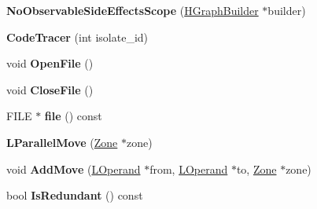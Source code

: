 \begin{DoxyCompactItemize}
\item 
\hypertarget{classv8_1_1internal_1_1_v8___f_i_n_a_l_a26fd2ae18963cc787e757897d83017cd}{}{\bfseries No\+Observable\+Side\+Effects\+Scope} (\hyperlink{classv8_1_1internal_1_1_h_graph_builder}{H\+Graph\+Builder} $\ast$builder)\label{classv8_1_1internal_1_1_v8___f_i_n_a_l_a26fd2ae18963cc787e757897d83017cd}

\item 
\hypertarget{classv8_1_1internal_1_1_v8___f_i_n_a_l_af9c1d9a94226317ecd0616056737d194}{}{\bfseries Code\+Tracer} (int isolate\+\_\+id)\label{classv8_1_1internal_1_1_v8___f_i_n_a_l_af9c1d9a94226317ecd0616056737d194}

\item 
\hypertarget{classv8_1_1internal_1_1_v8___f_i_n_a_l_aa5997ee7bfec3b18ab6f8c9a5dafd256}{}void {\bfseries Open\+File} ()\label{classv8_1_1internal_1_1_v8___f_i_n_a_l_aa5997ee7bfec3b18ab6f8c9a5dafd256}

\item 
\hypertarget{classv8_1_1internal_1_1_v8___f_i_n_a_l_a74d8c9b124c1b5a9e1134b5cfc484f50}{}void {\bfseries Close\+File} ()\label{classv8_1_1internal_1_1_v8___f_i_n_a_l_a74d8c9b124c1b5a9e1134b5cfc484f50}

\item 
\hypertarget{classv8_1_1internal_1_1_v8___f_i_n_a_l_af6e50f7ae2b70fe1111238bd7e3cf4ab}{}F\+I\+L\+E $\ast$ {\bfseries file} () const \label{classv8_1_1internal_1_1_v8___f_i_n_a_l_af6e50f7ae2b70fe1111238bd7e3cf4ab}

\item 
\hypertarget{classv8_1_1internal_1_1_v8___f_i_n_a_l_a8f517bb718ed677f813801457b224ca3}{}{\bfseries L\+Parallel\+Move} (\hyperlink{classv8_1_1internal_1_1_zone}{Zone} $\ast$zone)\label{classv8_1_1internal_1_1_v8___f_i_n_a_l_a8f517bb718ed677f813801457b224ca3}

\item 
\hypertarget{classv8_1_1internal_1_1_v8___f_i_n_a_l_ae0800220a2070973765144cce86c5200}{}void {\bfseries Add\+Move} (\hyperlink{classv8_1_1internal_1_1_l_operand}{L\+Operand} $\ast$from, \hyperlink{classv8_1_1internal_1_1_l_operand}{L\+Operand} $\ast$to, \hyperlink{classv8_1_1internal_1_1_zone}{Zone} $\ast$zone)\label{classv8_1_1internal_1_1_v8___f_i_n_a_l_ae0800220a2070973765144cce86c5200}

\item 
\hypertarget{classv8_1_1internal_1_1_v8___f_i_n_a_l_ac4a2748c814487e0ed4d22dff6203329}{}bool {\bfseries Is\+Redundant} () const \label{classv8_1_1internal_1_1_v8___f_i_n_a_l_ac4a2748c814487e0ed4d22dff6203329}


\end{DoxyCompactItemize}
